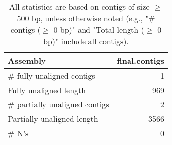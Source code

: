 \documentclass[12pt,a4paper]{article}
\begin{document}
\begin{table}[ht]
\begin{center}
\caption{All statistics are based on contigs of size $\geq$ 500 bp, unless otherwise noted (e.g., "\# contigs ($\geq$ 0 bp)" and "Total length ($\geq$ 0 bp)" include all contigs).}
\begin{tabular}{|l*{1}{|r}|}
\hline
Assembly & final.contigs \\ \hline
\# fully unaligned contigs & 1 \\ \hline
Fully unaligned length & 969 \\ \hline
\# partially unaligned contigs & 2 \\ \hline
Partially unaligned length & 3566 \\ \hline
\# N's & 0 \\ \hline
\end{tabular}
\end{center}
\end{table}
\end{document}
